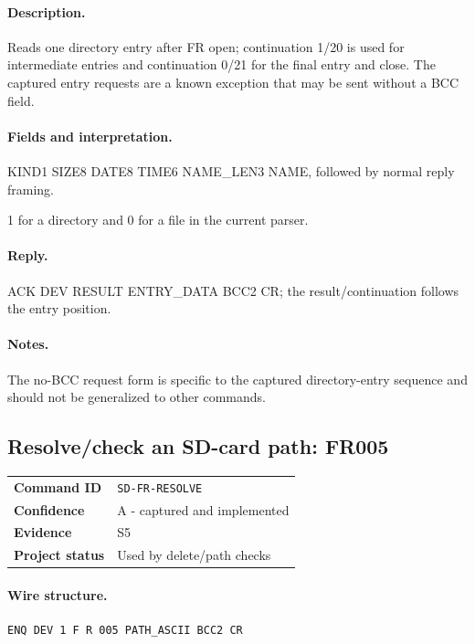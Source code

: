 \documentclass[10pt,letterpaper]{article}
\begin{document}
\paragraph{Description.} Reads one directory entry after FR open; continuation 1/20 is used for intermediate entries and continuation 0/21 for the final entry and close. The captured entry requests are a known exception that may be sent without a BCC field.
\paragraph{Fields and interpretation.}
\begin{description}[style=nextline,leftmargin=3.2cm,labelwidth=3.0cm,font=\normalfont\bfseries]
\item[Entry payload] KIND1 SIZE8 DATE8 TIME6 NAME\_LEN3 NAME, followed by normal reply framing.
\item[KIND1] 1 for a directory and 0 for a file in the current parser.
\end{description}
\paragraph{Reply.} ACK DEV RESULT ENTRY\_DATA BCC2 CR; the result/continuation follows the entry position.
\paragraph{Notes.} The no-BCC request form is specific to the captured directory-entry sequence and should not be generalized to other commands.

\subsection{Resolve/check an SD-card path: FR005}
\begin{tabularx}{\textwidth}{@{}>{\bfseries}p{2.8cm}X@{}}
Command ID & \texttt{SD-FR-RESOLVE} \\
Confidence & A - captured and implemented \\
Evidence & S5 \\
Project status & Used by delete/path checks \\
\end{tabularx}
\vspace{0.35em}
\paragraph{Wire structure.}
\begin{Verbatim}[breaklines=true,breakanywhere=true,fontsize=\small]
ENQ DEV 1 F R 005 PATH_ASCII BCC2 CR
\end{Verbatim}
\end{document}
